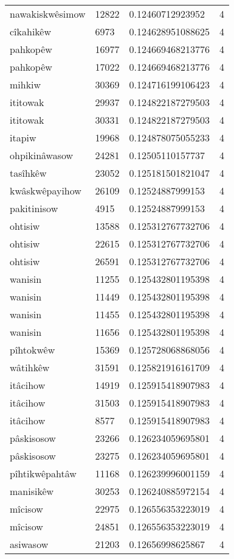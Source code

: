 \begin{longtable}{llll}
nawakiskwêsimow & 12822 & 0.12460712923952 & 4 \\
cîkahikêw & 6973 & 0.124628951088625 & 4 \\
pahkopêw & 16977 & 0.124669468213776 & 4 \\
pahkopêw & 17022 & 0.124669468213776 & 4 \\
mihkiw & 30369 & 0.124716199106423 & 4 \\
ititowak & 29937 & 0.124822187279503 & 4 \\
ititowak & 30331 & 0.124822187279503 & 4 \\
itapiw & 19968 & 0.124878075055233 & 4 \\
ohpikinâwasow & 24281 & 0.12505110157737 & 4 \\
tasîhkêw & 23052 & 0.125181501821047 & 4 \\
kwâskwêpayihow & 26109 & 0.12524887999153 & 4 \\
pakitinisow & 4915 & 0.12524887999153 & 4 \\
ohtisiw & 13588 & 0.125312767732706 & 4 \\
ohtisiw & 22615 & 0.125312767732706 & 4 \\
ohtisiw & 26591 & 0.125312767732706 & 4 \\
wanisin & 11255 & 0.125432801195398 & 4 \\
wanisin & 11449 & 0.125432801195398 & 4 \\
wanisin & 11455 & 0.125432801195398 & 4 \\
wanisin & 11656 & 0.125432801195398 & 4 \\
pîhtokwêw & 15369 & 0.125728068868056 & 4 \\
wâtihkêw & 31591 & 0.125821916161709 & 4 \\
itâcihow & 14919 & 0.125915418907983 & 4 \\
itâcihow & 31503 & 0.125915418907983 & 4 \\
itâcihow & 8577 & 0.125915418907983 & 4 \\
pâskisosow & 23266 & 0.126234059695801 & 4 \\
pâskisosow & 23275 & 0.126234059695801 & 4 \\
pîhtikwêpahtâw & 11168 & 0.126239996001159 & 4 \\
manisikêw & 30253 & 0.126240885972154 & 4 \\
mîcisow & 22975 & 0.126556353223019 & 4 \\
mîcisow & 24851 & 0.126556353223019 & 4 \\
asiwasow & 21203 & 0.12656998625867 & 4 \\

\end{longtable}
